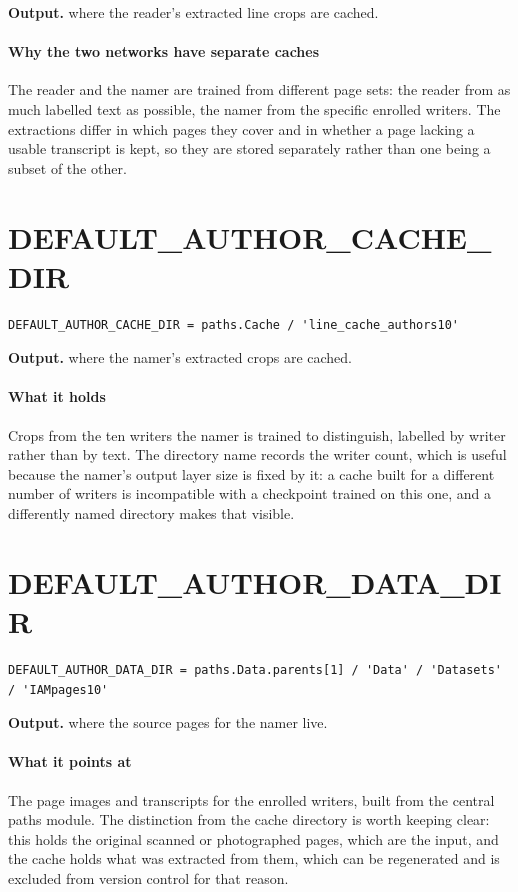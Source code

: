 \noindent\textbf{Output.} where the reader's extracted line crops are cached.


\paragraph{Why the two networks have separate caches}
The reader and the namer are trained from different page sets: the reader from as much labelled text as possible, the namer from the specific enrolled writers. The extractions differ in which pages they cover and in whether a page lacking a usable transcript is kept, so they are stored separately rather than one being a subset of the other.


\section{DEFAULT\_AUTHOR\_CACHE\_DIR}
\begin{lstlisting}[style=sig]
DEFAULT_AUTHOR_CACHE_DIR = paths.Cache / 'line_cache_authors10'
\end{lstlisting}

\noindent\textbf{Output.} where the namer's extracted crops are cached.


\paragraph{What it holds}
Crops from the ten writers the namer is trained to distinguish, labelled by writer rather than by text. The directory name records the writer count, which is useful because the namer's output layer size is fixed by it: a cache built for a different number of writers is incompatible with a checkpoint trained on this one, and a differently named directory makes that visible.


\section{DEFAULT\_AUTHOR\_DATA\_DIR}
\begin{lstlisting}[style=sig]
DEFAULT_AUTHOR_DATA_DIR = paths.Data.parents[1] / 'Data' / 'Datasets' / 'IAMpages10'
\end{lstlisting}

\noindent\textbf{Output.} where the source pages for the namer live.


\paragraph{What it points at}
The page images and transcripts for the enrolled writers, built from the central paths module. The distinction from the cache directory is worth keeping clear: this holds the original scanned or photographed pages, which are the input, and the cache holds what was extracted from them, which can be regenerated and is excluded from version control for that reason.



